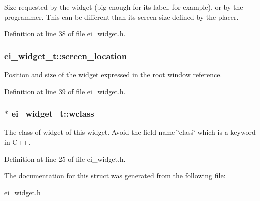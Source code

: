 Size requested by the widget (big enough for its label, for example), or by the programmer. This can be different than its screen size defined by the placer. 

Definition at line 38 of file ei\_\-widget.h.\hypertarget{structei__widget__t_ad139e1541329b54e0b4c8d746e14b204}{
\subsubsection[{screen\_\-location}]{ {\bf ei\_\-widget\_\-t::screen\_\-location}}}
\label{structei__widget__t_ad139e1541329b54e0b4c8d746e14b204}


Position and size of the widget expressed in the root window reference. 

Definition at line 39 of file ei\_\-widget.h.\hypertarget{structei__widget__t_a429e970e1d266252df4dbe55296b9f70}{
\subsubsection[{wclass}]{$\ast$ {\bf ei\_\-widget\_\-t::wclass}}}
\label{structei__widget__t_a429e970e1d266252df4dbe55296b9f70}


The class of widget of this widget. Avoid the field name \char`\"{}class\char`\"{} which is a keyword in C++. 

Definition at line 25 of file ei\_\-widget.h.

The documentation for this struct was generated from the following file:\begin{DoxyCompactItemize}
\item 
\hyperlink{ei__widget_8h}{ei\_\-widget.h}\end{DoxyCompactItemize}
